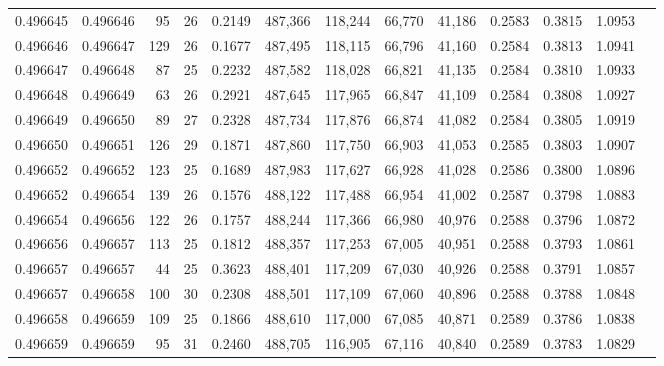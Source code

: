 \begin{tabular}{rrrrrrrrrrrrr}
0.496645 & 0.496646 &  95 &  26 &                                     0.2149 & 487,366 & 118,244 &  66,770 &  41,186 & 0.2583 & 0.3815 & 1.0953 \\
0.496646 & 0.496647 & 129 &  26 &                                     0.1677 & 487,495 & 118,115 &  66,796 &  41,160 & 0.2584 & 0.3813 & 1.0941 \\
0.496647 & 0.496648 &  87 &  25 &                                     0.2232 & 487,582 & 118,028 &  66,821 &  41,135 & 0.2584 & 0.3810 & 1.0933 \\
0.496648 & 0.496649 &  63 &  26 &                                     0.2921 & 487,645 & 117,965 &  66,847 &  41,109 & 0.2584 & 0.3808 & 1.0927 \\
0.496649 & 0.496650 &  89 &  27 &                                     0.2328 & 487,734 & 117,876 &  66,874 &  41,082 & 0.2584 & 0.3805 & 1.0919 \\
0.496650 & 0.496651 & 126 &  29 &                                     0.1871 & 487,860 & 117,750 &  66,903 &  41,053 & 0.2585 & 0.3803 & 1.0907 \\
0.496652 & 0.496652 & 123 &  25 &                                     0.1689 & 487,983 & 117,627 &  66,928 &  41,028 & 0.2586 & 0.3800 & 1.0896 \\
0.496652 & 0.496654 & 139 &  26 &                                     0.1576 & 488,122 & 117,488 &  66,954 &  41,002 & 0.2587 & 0.3798 & 1.0883 \\
0.496654 & 0.496656 & 122 &  26 &                                     0.1757 & 488,244 & 117,366 &  66,980 &  40,976 & 0.2588 & 0.3796 & 1.0872 \\
0.496656 & 0.496657 & 113 &  25 &                                     0.1812 & 488,357 & 117,253 &  67,005 &  40,951 & 0.2588 & 0.3793 & 1.0861 \\
0.496657 & 0.496657 &  44 &  25 &                                     0.3623 & 488,401 & 117,209 &  67,030 &  40,926 & 0.2588 & 0.3791 & 1.0857 \\
0.496657 & 0.496658 & 100 &  30 &                                     0.2308 & 488,501 & 117,109 &  67,060 &  40,896 & 0.2588 & 0.3788 & 1.0848 \\
0.496658 & 0.496659 & 109 &  25 &                                     0.1866 & 488,610 & 117,000 &  67,085 &  40,871 & 0.2589 & 0.3786 & 1.0838 \\
0.496659 & 0.496659 &  95 &  31 &                                     0.2460 & 488,705 & 116,905 &  67,116 &  40,840 & 0.2589 & 0.3783 & 1.0829 \\

\end{tabular}
